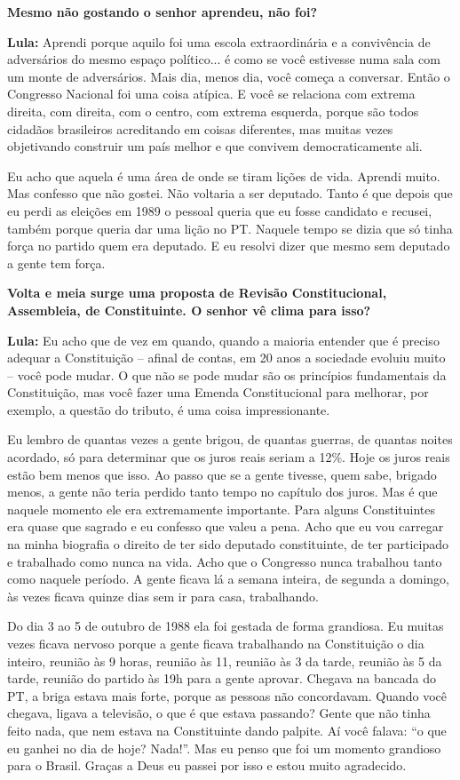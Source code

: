 \textbf{Mesmo não gostando o senhor aprendeu, não foi?}

\textbf{Lula:} Aprendi porque aquilo foi uma escola extraordinária e a
convivência de adversários do mesmo espaço político... é como se você
estivesse numa sala com um monte de adversários. Mais dia, menos dia,
você começa a conversar. Então o Congresso Nacional foi uma coisa
atípica. E você se relaciona com extrema direita, com direita, com o
centro, com extrema esquerda, porque são todos cidadãos brasileiros
acreditando em coisas diferentes, mas muitas vezes objetivando construir
um país melhor e que convivem democraticamente ali.

Eu acho que aquela é uma área de onde se tiram lições de vida. Aprendi
muito. Mas confesso que não gostei. Não voltaria a ser deputado. Tanto é
que depois que eu perdi as eleições em 1989 o pessoal queria que eu
fosse candidato e recusei, também porque queria dar uma lição no PT.
Naquele tempo se dizia que só tinha força no partido quem era deputado.
E eu resolvi dizer que mesmo sem deputado a gente tem força.

\textbf{Volta e meia surge uma proposta de Revisão Constitucional,
Assembleia, de Constituinte. O senhor vê clima para isso?}

\textbf{Lula:} Eu acho que de vez em quando, quando a maioria entender
que é preciso adequar a Constituição -- afinal de contas, em 20 anos a
sociedade evoluiu muito -- você pode mudar. O que não se pode mudar são
os princípios fundamentais da Constituição, mas você fazer uma Emenda
Constitucional para melhorar, por exemplo, a questão do tributo, é uma
coisa impressionante.

Eu lembro de quantas vezes a gente brigou, de quantas guerras, de
quantas noites acordado, só para determinar que os juros reais seriam a
12\%. Hoje os juros reais estão bem menos que isso. Ao passo que se a
gente tivesse, quem sabe, brigado menos, a gente não teria perdido tanto
tempo no capítulo dos juros. Mas é que naquele momento ele era
extremamente importante. Para alguns Constituintes era quase que sagrado
e eu confesso que valeu a pena. Acho que eu vou carregar na minha
biografia o direito de ter sido deputado constituinte, de ter
participado e trabalhado como nunca na vida. Acho que o Congresso nunca
trabalhou tanto como naquele período. A gente ficava lá a semana
inteira, de segunda a domingo, às vezes ficava quinze dias sem ir para
casa, trabalhando.

Do dia 3 ao 5 de outubro de 1988 ela foi gestada de forma grandiosa. Eu
muitas vezes ficava nervoso porque a gente ficava trabalhando na
Constituição o dia inteiro, reunião às 9 horas, reunião às 11, reunião
às 3 da tarde, reunião às 5 da tarde, reunião do partido às 19h para a
gente aprovar. Chegava na bancada do PT, a briga estava mais forte,
porque as pessoas não concordavam. Quando você chegava, ligava a
televisão, o que é que estava passando? Gente que não tinha feito nada,
que nem estava na Constituinte dando palpite. Aí você falava: ``o que eu
ganhei no dia de hoje? Nada!''. Mas eu penso que foi um momento
grandioso para o Brasil. Graças a Deus eu passei por isso e estou muito
agradecido.

